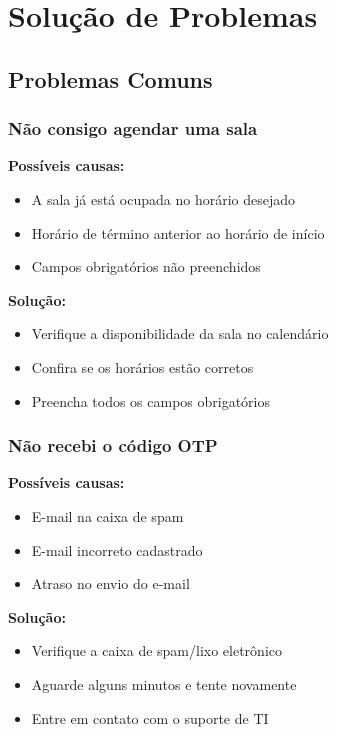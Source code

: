 \documentclass[12pt,a4paper]{article}
\begin{document}
\newpage

\section{Solução de Problemas}

\subsection{Problemas Comuns}

\subsubsection{Não consigo agendar uma sala}

\textbf{Possíveis causas:}
\begin{itemize}[leftmargin=*]
    \item A sala já está ocupada no horário desejado
    \item Horário de término anterior ao horário de início
    \item Campos obrigatórios não preenchidos
\end{itemize}

\textbf{Solução:}
\begin{itemize}[leftmargin=*]
    \item Verifique a disponibilidade da sala no calendário
    \item Confira se os horários estão corretos
    \item Preencha todos os campos obrigatórios
\end{itemize}

\subsubsection{Não recebi o código OTP}

\textbf{Possíveis causas:}
\begin{itemize}[leftmargin=*]
    \item E-mail na caixa de spam
    \item E-mail incorreto cadastrado
    \item Atraso no envio do e-mail
\end{itemize}

\textbf{Solução:}
\begin{itemize}[leftmargin=*]
    \item Verifique a caixa de spam/lixo eletrônico
    \item Aguarde alguns minutos e tente novamente
    \item Entre em contato com o suporte de TI
\end{itemize}
\end{document}
